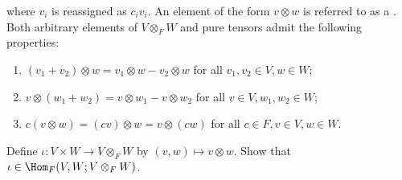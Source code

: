 \begin{definition}
        where $v_i$ is reassigned as $c_i v_i $. An element of the form $v \otimes w$ is referred to as a . Both arbitrary elements of $V \otimes_F W$ and pure tensors admit the following properties:
            \begin{enumerate}[label = (\arabic*)]
                \item $\left(v_1+v_2\right) \otimes w=v_1 \otimes w-v_2 \otimes w$ for all $v_1, v_2 \in V, w \in W$;
                \item $v \otimes\left(w_1+w_2\right)=v \otimes w_1-v \otimes w_2$ for all $v \in V, w_1, w_2 \in W$;
                \item $c(v \otimes w)=(c v) \otimes w=v \otimes(c w)$ for all $c \in F, v \in V, w \in W$.
            \end{enumerate}
    \end{definition}

    \begin{exercise}
        Define $\iota:V \times W \rightarrow V \otimes_F W$ by $(v,w) \mapsto v \otimes w$. Show that $\iota \in \Hom_F(V,W;V \otimes_F W)$.
    \end{exercise}

